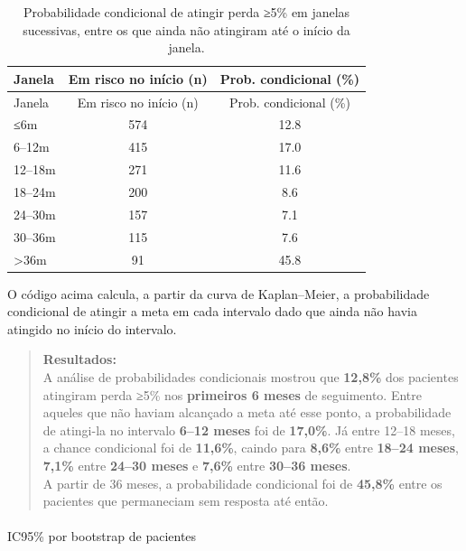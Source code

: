 \documentclass[
]{article}
\makeatletter
\let\oldparagraph\paragraph
\renewcommand{\paragraph}{
    \@ifstar
      \xxxParagraphStar
      \xxxParagraphNoStar
  }
\newcommand{\xxxParagraphStar}[1]{\oldparagraph*{#1}\mbox{}}
\newcommand{\xxxParagraphNoStar}[1]{\oldparagraph{#1}\mbox{}}
\makeatother
\begin{document}
\begin{longtable}[]{@{}lcc@{}}
\caption{Probabilidade condicional de atingir perda ≥5\% em janelas
sucessivas, entre os que ainda não atingiram até o início da
janela.}\tabularnewline
\toprule\noalign{}
Janela & Em risco no início (n) & Prob. condicional (\%) \\
\midrule\noalign{}
\endfirsthead
\toprule\noalign{}
Janela & Em risco no início (n) & Prob. condicional (\%) \\
\midrule\noalign{}
\endhead
\bottomrule\noalign{}
\endlastfoot
≤6m & 574 & 12.8 \\
6--12m & 415 & 17.0 \\
12--18m & 271 & 11.6 \\
18--24m & 200 & 8.6 \\
24--30m & 157 & 7.1 \\
30--36m & 115 & 7.6 \\
\textgreater36m & 91 & 45.8 \\
\end{longtable}

O código acima calcula, a partir da curva de Kaplan--Meier, a
probabilidade condicional de atingir a meta em cada intervalo dado que
ainda não havia atingido no início do intervalo.

\begin{quote}
\textbf{Resultados:}\\
A análise de probabilidades condicionais mostrou que \textbf{12,8\%} dos
pacientes atingiram perda ≥5\% nos \textbf{primeiros 6 meses} de
seguimento. Entre aqueles que não haviam alcançado a meta até esse
ponto, a probabilidade de atingi-la no intervalo \textbf{6--12 meses}
foi de \textbf{17,0\%}. Já entre 12--18 meses, a chance condicional foi
de \textbf{11,6\%}, caindo para \textbf{8,6\%} entre \textbf{18--24
meses}, \textbf{7,1\%} entre \textbf{24--30 meses} e \textbf{7,6\%}
entre \textbf{30--36 meses}.\\
A partir de 36 meses, a probabilidade condicional foi de \textbf{45,8\%}
entre os pacientes que permaneciam sem resposta até então.\\
\end{quote}

\paragraph{IC95\% por bootstrap de
pacientes}\label{ic95-por-bootstrap-de-pacientes}
\end{document}
